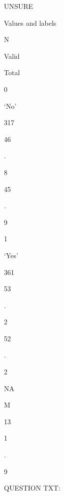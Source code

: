 \documentclass[
  letterpaper,
]{scrbook}
\begin{document}
UNSURE

Values and labels

N

Valid

Total

0

`No'

317

46

.

8

45

.

9

1

`Yes'

361

53

.

2

52

.

2

NA

M

13

1

.

9

QUESTION TXT:
\end{document}
